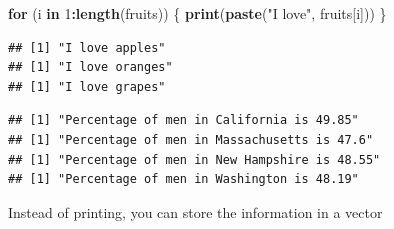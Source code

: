 \documentclass[]{book}
\newenvironment{Shaded}{\begin{snugshade}}{\end{snugshade}}
\newcommand{\KeywordTok}[1]{\textcolor[rgb]{0.13,0.29,0.53}{\textbf{#1}}}
\newcommand{\DataTypeTok}[1]{\textcolor[rgb]{0.13,0.29,0.53}{#1}}
\newcommand{\DecValTok}[1]{\textcolor[rgb]{0.00,0.00,0.81}{#1}}
\newcommand{\StringTok}[1]{\textcolor[rgb]{0.31,0.60,0.02}{#1}}
\newcommand{\ControlFlowTok}[1]{\textcolor[rgb]{0.13,0.29,0.53}{\textbf{#1}}}
\newcommand{\OperatorTok}[1]{\textcolor[rgb]{0.81,0.36,0.00}{\textbf{#1}}}
\newcommand{\NormalTok}[1]{#1}
\theoremstyle{definition}
\theoremstyle{definition}
\theoremstyle{definition}
\theoremstyle{remark}
\begin{document}
\begin{Shaded}
\begin{Highlighting}[]
\ControlFlowTok{for}\NormalTok{ (i }\ControlFlowTok{in} \DecValTok{1}\OperatorTok{:}\KeywordTok{length}\NormalTok{(fruits)) \{}
  \KeywordTok{print}\NormalTok{(}\KeywordTok{paste}\NormalTok{(}\StringTok{"I love"}\NormalTok{, fruits[i]))}
\NormalTok{\}}
\end{Highlighting}
\end{Shaded}

\begin{verbatim}
## [1] "I love apples"
## [1] "I love oranges"
## [1] "I love grapes"
\end{verbatim}

\begin{Shaded}
\end{Shaded}

\begin{verbatim}
## [1] "Percentage of men in California is 49.85"
## [1] "Percentage of men in Massachusetts is 47.6"
## [1] "Percentage of men in New Hampshire is 48.55"
## [1] "Percentage of men in Washington is 48.19"
\end{verbatim}

Instead of printing, you can store the information in a vector
\end{document}
